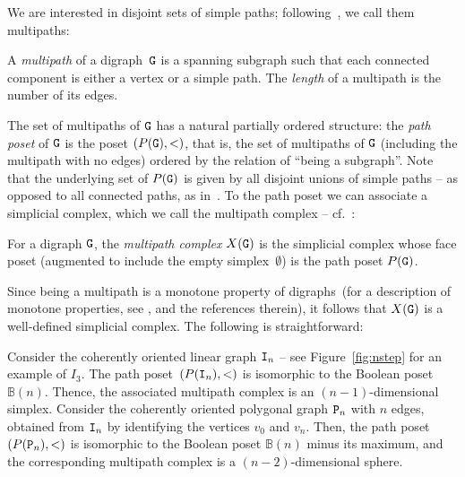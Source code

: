 \documentclass{amsart}
\begin{document}
We are interested in disjoint sets of simple paths; following~\cite{turner}, we call them multipaths:

\begin{defn}\label{def:multipaths}
A \emph{multipath} of a digraph~${\tt G}$ is a spanning subgraph such that each connected component is either a vertex or a simple path. The \emph{length} of a multipath is the number of its edges. 
\end{defn}

The set of multipaths of ${\tt G}$ has a natural partially ordered structure: the \emph{path poset} of ${\tt G}$ is the poset $(P({\tt G}),<)$, that is, the set of multipaths of ${\tt G}$ (including the multipath with no edges) ordered by the relation of ``being a subgraph''. 
Note that the underlying set of $P({\tt G})$ is given by all disjoint unions of simple paths -- as opposed to all connected paths, as in~\cite[Section~3.1]{https://doi.org/10.48550/arxiv.2205.03730}.
To the path poset we can associate a simplicial complex, which we call the multipath complex  -- cf.~\cite[Definition~6.4]{secondo}:

\begin{defn}\label{def:pathcomplx}
For a digraph ${\tt G}$, the \emph{multipath complex} $X({\tt G})$ is the simplicial complex whose face poset (augmented to include the empty simplex~$\emptyset$) is the path poset $P({\tt G})$. 
\end{defn}


Since being a multipath is a monotone property of digraphs~(for a description of monotone properties, see \cite{bjorner_cdg}, and the references therein), it follows that $X({\tt G})$ is a well-defined simplicial complex.
The following is straightforward:

\begin{example}
Consider the coherently oriented linear graph ${\tt I}_n$ -- see Figure~\ref{fig:nstep} for an example of $I_3$.
The path poset~$(P({\tt I}_n), < )$ is isomorphic to the Boolean poset~$\mathbb{B}(n)$. Thence, the associated multipath complex is an $(n-1)$-dimensional simplex.
Consider the coherently oriented polygonal graph ${\tt P}_n$ with $n$ edges, obtained from ${\tt I}_{n}$ by identifying the vertices $v_0$ and $v_{n}$. Then, the path poset $(P({\tt P}_n),<)$ is isomorphic to the Boolean poset $\mathbb{B}(n)$ minus its maximum, and the corresponding multipath complex is a $(n-2)$-dimensional sphere.
\end{example}
\end{document}
